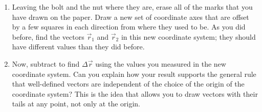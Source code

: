\documentclass[11pt]{article}
\begin{document}
\begin{enumerate}
\item Leaving the bolt and the nut where they are, erase all of the marks
  that you have drawn on the paper.  Draw a new set of coordinate axes
  that are offset by a few squares in each direction from where they used 
  to be.  As you did before, find the vectors ${\vec{r}_1}$ and ${\vec{r}_2}$ 
  in this new coordinate system; they should have different values
  than they did before. 

\item Now, subtract to find $\Delta {\vec r}$ using the values you measured
  in the new coordinate system.  Can you explain how your result supports the 
  general rule that well-defined vectors are independent of the choice of the 
  origin of the coordinate system?  This is the idea that allows you to
  draw vectors with their tails at any point, not only at the origin.

\end{enumerate}
\end{document}
